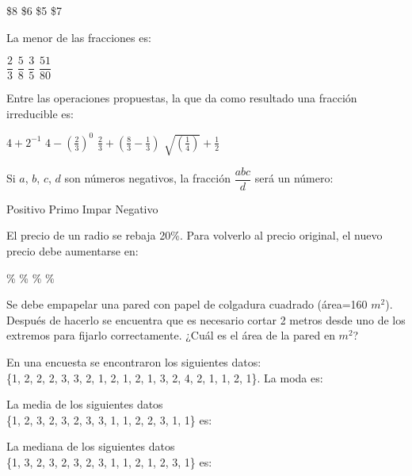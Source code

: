\documentclass[10pt,letterpaper,addpoints]{exam}
\begin{document}
\begin{multicols}{2}
\begin{questions}
\begin{oneparchoices}
\choice \$8
\choice \$6
\CorrectChoice \$5
\choice \$7
\end{oneparchoices}
\question La menor de las fracciones es:

\begin{oneparchoices}
\choice $\dfrac{2}{3}$
\choice $\dfrac{5}{8}$
\CorrectChoice $\dfrac{3}{5}$
\choice $\dfrac{51}{80}$
\end{oneparchoices}
\question Entre las operaciones propuestas, la que da como resultado una fracción irreducible es:
\begin{choices}
\CorrectChoice $4+2^{-1}$
\choice $4-(\frac{2}{3})^{0}$
\choice $\frac{2}{3}+(\frac{8}{3}-\frac{1}{3})$
\choice $\sqrt{(\frac{1}{4})}+\frac{1}{2}$
\end{choices}
\question Si $a$, $b$, $c$, $d$ son números negativos, la fracción $\dfrac{abc}{d}$ será un número:

\begin{choices}
\CorrectChoice Positivo
\choice Primo
\choice Impar
\choice Negativo
\end{choices}
\question El precio de un radio se rebaja 20\%. Para volverlo al precio original, el nuevo precio debe aumentarse en:

\begin{oneparchoices}
\%
\%
\%
\%
\end{oneparchoices}
\question Se debe empapelar una pared con papel de colgadura cuadrado (área=160 $m^{2}$). Después de hacerlo se encuentra que es necesario cortar 2 metros desde uno de los extremos para fijarlo correctamente. ¿Cuál es el área de la pared en $m^{2}$?

\begin{oneparchoices}
\end{oneparchoices}
\question En una encuesta se encontraron los siguientes datos:\\ \{1, 2, 2, 2, 3, 3, 2, 1, 2, 1, 2, 1, 3, 2, 4, 2, 1, 1, 2, 1\}. La moda es:

\begin{oneparchoices}
\end{oneparchoices}
\question La media de los siguientes datos\\ \{1, 2, 3, 2, 3, 2, 3, 3, 1, 1, 2, 2, 3, 1, 1\} es:

\begin{oneparchoices}
\end{oneparchoices}
\question La mediana de los siguientes datos\\ \{1, 3, 2, 3, 2, 3, 2, 3, 1, 1, 2, 1, 2, 3, 1\} es:


\end{questions}
\end{multicols}
\end{document}
